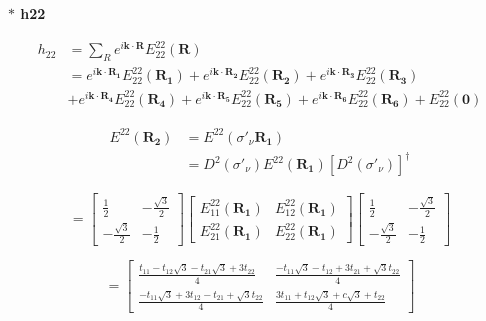 \documentclass{article}
\begin{document}
\noindent\textbf{ $\ast$ h22}

\begin{align*}
    h_{22} & = \sum_{R}^{} e^{i\mathbf{k\cdot R}} E^{22}_{22}(\textbf{R})                                                                                                                                \\
           & =  e^{i\mathbf{k\cdot R_1}} E^{22}_{22}(\mathbf{R_1}) +  e^{i\mathbf{k\cdot R_2}} E^{22}_{22}(\mathbf{R_2}) +  e^{i\mathbf{k\cdot R_3}} E^{22}_{22}(\mathbf{R_3})                           \\
           & +  e^{i\mathbf{k\cdot R_4}} E^{22}_{22}(\mathbf{R_4}) +  e^{i\mathbf{k\cdot R_5}} E^{22}_{22}(\mathbf{R_5}) +  e^{i\mathbf{k\cdot R_6}} E^{22}_{22}(\mathbf{R_6}) + E^{22}_{22}(\mathbf{0})
\end{align*}

\begin{align*}
    E^{22} (\mathbf{R_2})
     & =  E^{22} (\sigma'_\nu \mathbf{R_1})                                             \\
     & = D^2(\sigma'_\nu)  E^{22}(\mathbf{R_1}) \left[ D^2(\sigma'_\nu) \right]^\dagger
\end{align*}

\[
    \renewcommand{\arraystretch}{0.75}
    =
    \begin{bmatrix}
        \frac{1}{2}         & -\frac{\sqrt{3}}{2} \\
        -\frac{\sqrt{3}}{2} & -\frac{1}{2}
    \end{bmatrix}
    \begin{bmatrix}
        E_{11}^{22}(\mathbf{R_1}) & E_{12}^{22}(\mathbf{R_1}) \\
        E_{21}^{22}(\mathbf{R_1}) & E_{22}^{22}(\mathbf{R_1})
    \end{bmatrix}
    \begin{bmatrix}
        \frac{1}{2}         & -\frac{\sqrt{3}}{2} \\
        -\frac{\sqrt{3}}{2} & -\frac{1}{2}
    \end{bmatrix}
\]

\[
    \renewcommand{\arraystretch}{0.75}
    =
    \begin{bmatrix}
        \frac{t_{11} - t_{12}\sqrt{3} -t_{21}\sqrt{3} + 3t_{22}}{4}   & \frac{-t_{11}\sqrt{3} - t_{12} + 3t_{21} + \sqrt{3}t_{22}}{4} \\
        \frac{-t_{11}\sqrt{3} + 3t_{12} - t_{21} + \sqrt{3}t_{22}}{4} & \frac{3t_{11} + t_{12}\sqrt{3} + c\sqrt{3} + t_{22}}{4}
    \end{bmatrix}
\]
\end{document}
